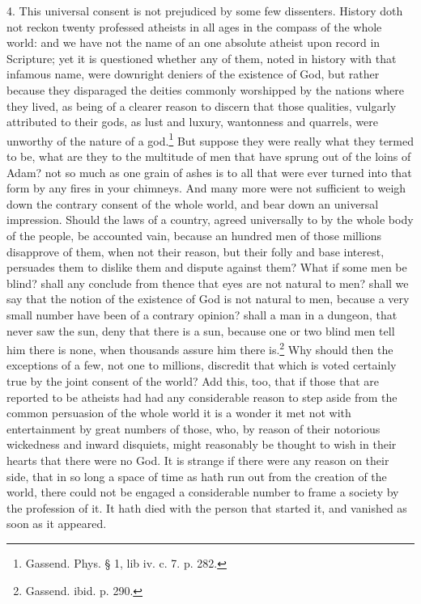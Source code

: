 \documentclass[a5paper]{book}
\begin{document}
4. This universal consent is not prejudiced by some few dissenters.
History doth not reckon twenty professed atheists in all ages 
    in the compass of the whole world: 
    and we have not the name of an one absolute atheist 
    upon record in Scripture; 
    yet it is questioned whether any of them, 
    noted in history with that infamous name, 
    were downright deniers of the existence of God, 
    but rather because they disparaged the deities commonly worshipped 
    by the nations where they lived, 
    as being of a clearer reason to discern that those qualities,
    vulgarly attributed to their gods, 
    as lust and luxury, 
    wantonness and quarrels, 
    were unworthy of the nature of a god.\footnote{Gassend. Phys. § 1, lib iv. c. 7. p. 282.}
But suppose they were really what they termed to be, 
    what are they to the multitude of men 
    that have sprung out of the loins of Adam? 
    not so much as one grain of ashes 
    is to all that were ever turned into that form by any fires in your chimneys. 
And many more were not sufficient
    to weigh down the contrary consent of the whole world, 
    and bear down an universal impression. 
Should the laws of a country, 
    agreed universally to by the whole body of the people, 
    be accounted vain,
    because an hundred men of those millions disapprove of them, 
    when not their reason, 
    but their folly and base interest, 
    persuades them to dislike them and dispute against them? 
What if some men be blind?
    shall any conclude from thence that eyes are not natural to men?
    shall we say that the notion of the existence of God 
    is not natural to men, 
    because a very small number have been of a contrary opinion?
    shall a man in a dungeon, that never saw the sun, deny that there is a sun, 
    because one or two blind men tell him there is none, 
    when thousands assure him there is.\footnote{Gassend. ibid. p. 290.}
Why should then the exceptions of a few, not one to millions, 
    discredit that which is voted certainly true 
    by the joint consent of the world? 
Add this, too, that if those that are reported to be atheists 
    had had any considerable reason 
    to step aside from the common persuasion of the whole world 
    it is a wonder it met not with entertainment by great numbers of those, 
    who, by reason of their notorious wickedness and inward disquiets, 
    might reasonably be thought to wish in their hearts 
    that there were no God. 
It is strange if there were any reason on their side, 
    that in so long a space of time as hath run out from the creation of the world,
    there could not be engaged a considerable number 
    to frame a society by the profession of it. 
It hath died with the person that started it,
    and vanished as soon as it appeared.
\end{document}
